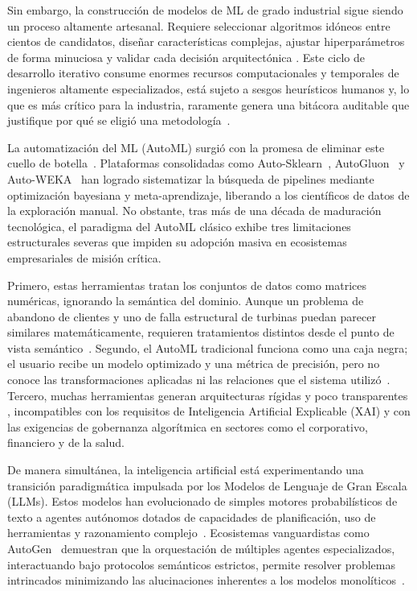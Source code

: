 \documentclass[conference]{IEEEtran}
\begin{document}
Sin embargo, la construcción de modelos de ML de grado industrial sigue siendo un proceso altamente artesanal. Requiere seleccionar algoritmos idóneos entre cientos de candidatos, diseñar características complejas, ajustar hiperparámetros de forma minuciosa y validar cada decisión arquitectónica \cite{doke2021automl}. Este ciclo de desarrollo iterativo consume enormes recursos computacionales y temporales de ingenieros altamente especializados, está sujeto a sesgos heurísticos humanos y, lo que es más crítico para la industria, raramente genera una bitácora auditable que justifique por qué se eligió una metodología~\cite{wu2022survey}.

La automatización del ML (AutoML) surgió con la promesa de eliminar este cuello de botella~\cite{hutter2019}. Plataformas consolidadas como Auto-Sklearn~\cite{feurer2019}, AutoGluon~\cite{erickson2020} y Auto-WEKA~\cite{kotthoff2017} han logrado sistematizar la búsqueda de pipelines mediante optimización bayesiana y meta-aprendizaje, liberando a los científicos de datos de la exploración manual. No obstante, tras más de una década de maduración tecnológica, el paradigma del AutoML clásico exhibe tres limitaciones estructurales severas que impiden su adopción masiva en ecosistemas empresariales de misión crítica.

Primero, estas herramientas tratan los conjuntos de datos como matrices numéricas, ignorando la semántica del dominio. Aunque un problema de abandono de clientes y uno de falla estructural de turbinas puedan parecer similares matemáticamente, requieren tratamientos distintos desde el punto de vista semántico~\cite{barbudo2023}. Segundo, el AutoML tradicional funciona como una caja negra; el usuario recibe un modelo optimizado y una métrica de precisión, pero no conoce las transformaciones aplicadas ni las relaciones que el sistema utilizó~\cite{gundersen2018}. Tercero, muchas herramientas generan arquitecturas rígidas y poco transparentes \cite{zou2025metalearning}, incompatibles con los requisitos de Inteligencia Artificial Explicable (XAI) y con las exigencias de gobernanza algorítmica en sectores como el corporativo, financiero y de la salud.

De manera simultánea, la inteligencia artificial está experimentando una transición paradigmática impulsada por los Modelos de Lenguaje de Gran Escala (LLMs). Estos modelos han evolucionado de simples motores probabilísticos de texto a agentes autónomos dotados de capacidades de planificación, uso de herramientas y razonamiento complejo~\cite{wang2025llmagent,yao2023react}. Ecosistemas vanguardistas como AutoGen~\cite{wu2023autogen} demuestran que la orquestación de múltiples agentes especializados, interactuando bajo protocolos semánticos estrictos, permite resolver problemas intrincados minimizando las alucinaciones inherentes a los modelos monolíticos~\cite{huang2023mlagentbench}.
\end{document}
